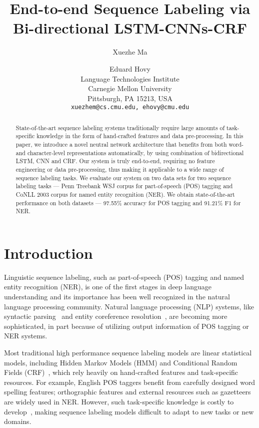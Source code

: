 \documentclass[11pt]{article}
\title{End-to-end Sequence Labeling via Bi-directional LSTM-CNNs-CRF}
\author{Xuezhe Ma \and Eduard Hovy \\
	    Language Technologies Institute \\
	    Carnegie Mellon University \\
	    Pittsburgh, PA 15213, USA \\
	    {\tt xuezhem@cs.cmu.edu, ehovy@cmu.edu}}
\date{}
\begin{document}
\maketitle

\begin{abstract}
State-of-the-art sequence labeling systems traditionally require large amounts of task-specific knowledge in the form of hand-crafted features and data pre-processing. In this paper, we introduce a novel neutral network architecture that benefits from both word- and character-level representations automatically, by using combination of bidirectional LSTM, CNN and CRF. Our system is truly end-to-end, requiring no feature engineering or data pre-processing, thus making it applicable to a wide range of sequence labeling tasks. We evaluate our system on two data sets for two sequence labeling tasks --- Penn Treebank WSJ corpus for part-of-speech (POS) tagging and CoNLL 2003 corpus for named entity recognition (NER). We obtain state-of-the-art performance on both datasets --- 97.55\% accuracy for POS tagging and 91.21\% F1 for NER.
\end{abstract}

\section{Introduction}
Linguistic sequence labeling, such as part-of-speech (POS) tagging and named entity recognition (NER), is one of the first stages in deep language understanding and its importance has been well recognized in the natural language processing community. Natural language processing (NLP) systems, like syntactic parsing~\cite{Nivre:2004,McDonald:2005,Koo:2010,ma-zhao:2012:POSTERS,ma2015probabilistic,chen-manning:2014:EMNLP2014,ma-hovy:2015:EMNLP} and entity coreference resolution~\cite{ng:2010:ACL,ma-hovy:2016:NAACL}, are becoming more sophisticated, in part because of utilizing output information of POS tagging or NER systems.

Most traditional high performance sequence labeling models are linear statistical models, including Hidden Markov Models (HMM) and Conditional Random Fields (CRF)~\cite{ratinov2009design,passos-kumar-mccallum:2014:W14-16,luo-EtAl:2015:EMNLP2}, which rely heavily on hand-crafted features and task-specific resources. For example, English POS taggers benefit from carefully designed word spelling features; orthographic features and external resources such as gazetteers are widely used in NER. However, such task-specific knowledge is costly to develop~\cite{ma-xia:2014:P14-1}, making sequence labeling models difficult to adapt to new tasks or new domains.
\end{document}
